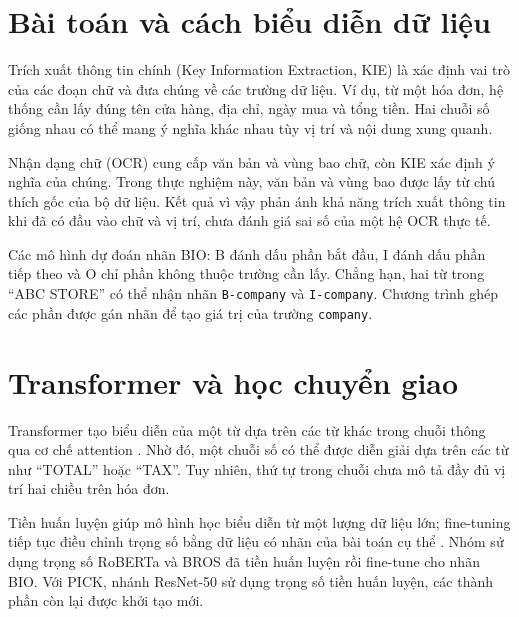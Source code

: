 \section{Bài toán và cách biểu diễn dữ liệu}
Trích xuất thông tin chính (Key Information Extraction, KIE) là xác định vai trò của các đoạn chữ và đưa chúng về các trường dữ liệu. Ví dụ, từ một hóa đơn, hệ thống cần lấy đúng tên cửa hàng, địa chỉ, ngày mua và tổng tiền. Hai chuỗi số giống nhau có thể mang ý nghĩa khác nhau tùy vị trí và nội dung xung quanh.

Nhận dạng chữ (OCR) cung cấp văn bản và vùng bao chữ, còn KIE xác định ý nghĩa của chúng. Trong thực nghiệm này, văn bản và vùng bao được lấy từ chú thích gốc của bộ dữ liệu. Kết quả vì vậy phản ánh khả năng trích xuất thông tin khi đã có đầu vào chữ và vị trí, chưa đánh giá sai số của một hệ OCR thực tế.

Các mô hình dự đoán nhãn BIO: B đánh dấu phần bắt đầu, I đánh dấu phần tiếp theo và O chỉ phần không thuộc trường cần lấy. Chẳng hạn, hai từ trong ``ABC STORE'' có thể nhận nhãn \texttt{B-company} và \texttt{I-company}. Chương trình ghép các phần được gán nhãn để tạo giá trị của trường \texttt{company}.

\section{Transformer và học chuyển giao}
Transformer tạo biểu diễn của một từ dựa trên các từ khác trong chuỗi thông qua cơ chế attention \parencite{vaswani2017}. Nhờ đó, một chuỗi số có thể được diễn giải dựa trên các từ như ``TOTAL'' hoặc ``TAX''. Tuy nhiên, thứ tự trong chuỗi chưa mô tả đầy đủ vị trí hai chiều trên hóa đơn.

Tiền huấn luyện giúp mô hình học biểu diễn từ một lượng dữ liệu lớn; fine-tuning tiếp tục điều chỉnh trọng số bằng dữ liệu có nhãn của bài toán cụ thể \parencite{devlin2019}. Nhóm sử dụng trọng số RoBERTa và BROS đã tiền huấn luyện rồi fine-tune cho nhãn BIO. Với PICK, nhánh ResNet-50 sử dụng trọng số tiền huấn luyện, các thành phần còn lại được khởi tạo mới.
